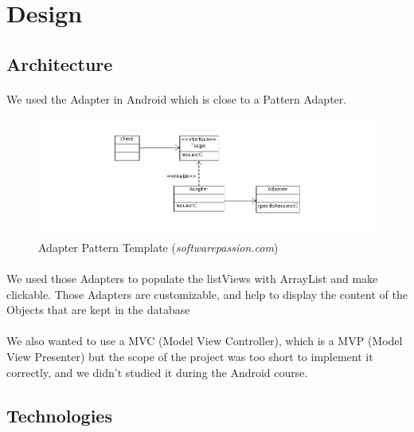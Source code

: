 \documentclass[paper=a4, fontsize=12pt,DIV=14]{scrartcl}    %
\begin{document}
    \newpage
        \section{Design}
        	\subsection{Architecture}
				\paragraph{}We used the Adapter in Android which is close to a Pattern Adapter.

				\begin{figure}[!htbp]
					\center
		            \includegraphics[scale=0.5]{img/adapterpattern.png}
		            \caption{Adapter Pattern Template (\textit{softwarepassion.com})}
				\end{figure}

				\paragraph{}We used those Adapters to populate the listViews with ArrayList and make clickable. Those Adapters are customizable, and help to display the content of the Objects that are kept in the database 

				\paragraph{}We also wanted to use a MVC (Model View Controller), which is a MVP (Model View Presenter) but the scope of the project was too short to implement it correctly, and we didn't studied it during the Android course.

        	\newpage
        	\subsection{Technologies}
        		
\end{document}
